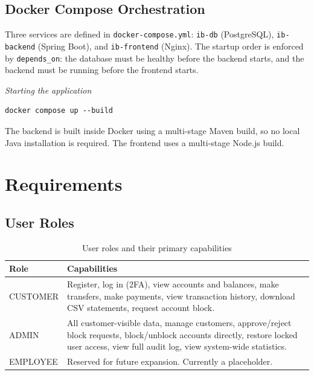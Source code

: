 \documentclass[12pt,a4paper]{report}
\begin{document}
\section{Docker Compose Orchestration}

Three services are defined in \texttt{docker-compose.yml}: \texttt{ib-db}
(PostgreSQL), \texttt{ib-backend} (Spring Boot), and \texttt{ib-frontend} (Nginx).
The startup order is enforced by \texttt{depends\_on}: the database must be healthy
before the backend starts, and the backend must be running before the frontend starts.


\textit{\small Starting the application}\vspace{2pt}
\begin{Verbatim}[frame=single,fontsize=\small,bgcolor=codegray]
docker compose up --build
\end{Verbatim}


The backend is built inside Docker using a multi-stage Maven build, so no local
Java installation is required. The frontend uses a multi-stage Node.js build.

\chapter{Requirements}
\label{ch:requirements}

\section{User Roles}

\begin{table}[H]
  \centering
  \caption{User roles and their primary capabilities}
  \label{tab:roles}
  \begin{tabular}{lp{9cm}}
    \toprule
    \textbf{Role} & \textbf{Capabilities} \\
    \midrule
    CUSTOMER  & Register, log in (2FA), view accounts and balances, make transfers,
                make payments, view transaction history, download CSV statements,
                request account block. \\
    \midrule
    ADMIN     & All customer-visible data, manage customers, approve/reject block
                requests, block/unblock accounts directly, restore locked user access,
                view full audit log, view system-wide statistics. \\
    \midrule
    EMPLOYEE  & Reserved for future expansion. Currently a placeholder. \\
    \bottomrule
  \end{tabular}
\end{table}
\end{document}
